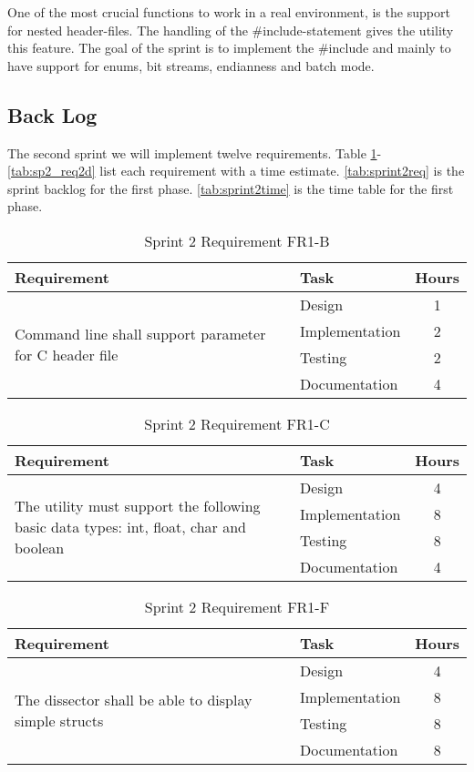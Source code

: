 One of the most crucial functions to work in a real environment, is the support for nested header-files. The handling of the \#include-statement gives the utility this feature. The goal of the sprint is to implement the \#include and mainly to have support for enums, bit streams, endianness and batch mode. 


\subsection{Back Log}
The second sprint we will implement twelve requirements. Table
\ref{tab:sp2_req1b}-\ref{tab:sp2_req2d}  list each requirement with a time
estimate. \autoref{tab:sprint2req} is the sprint backlog for the first phase.
\autoref{tab:sprint2time} is the time table for the first phase.

\begin{table}[!ht] \small \center
\caption{Sprint 2 Requirement FR1-B\label{tab:sp2_req1b}}
\begin{tabular}{l l c}
	\toprule
	Requirement & Task & Hours \\
	\midrule
	\multirow{4}{5cm}{Command line shall support parameter for C header file} & Design & 1 \\
	& Implementation & 2 \\
	& Testing & 2 \\
	& Documentation & 4 \\
	\bottomrule
\end{tabular}
\end{table}

\begin{table}[!ht] \small \center
\caption{Sprint 2 Requirement FR1-C\label{tab:sp2_req1c}}
\begin{tabular}{l l c}
	\toprule
	Requirement & Task & Hours \\
	\midrule
	\multirow{4}{5cm}{The utility must support the following basic data types: int, float, char and boolean} & Design & 4 \\
	& Implementation & 8 \\
	& Testing & 8 \\
	& Documentation & 4 \\
	\bottomrule
\end{tabular}
\end{table}

\begin{table}[!ht] \small \center
\caption{Sprint 2 Requirement FR1-F\label{tab:sp2_req1f}}
\begin{tabular}{l l c}
	\toprule
	Requirement & Task & Hours \\
	\midrule
	\multirow{4}{5cm}{The dissector shall be able to display simple structs} & Design & 4 \\
	& Implementation & 8 \\
	& Testing & 8 \\
	& Documentation & 8 \\
	\bottomrule
\end{tabular}
\end{table}

